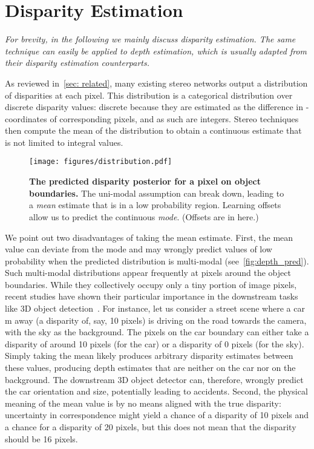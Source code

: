 \documentclass{article}
\begin{document}
 \section{Disparity Estimation}
\label{sec: approach}

\textit{For brevity, in the following we mainly discuss disparity estimation. The same technique can easily be applied to depth estimation, which is usually adapted from their disparity estimation counterparts.}


As reviewed in~\autoref{sec: related}, many existing stereo networks output a distribution of disparities at each pixel. 
This distribution is a categorical distribution over discrete disparity values: discrete because they are estimated as the difference in -coordinates of corresponding pixels, and as such are integers.
Stereo techniques then compute the mean of the distribution to obtain a continuous estimate that is not limited to integral values.

\begin{wrapfigure}{r}{0.7\textwidth}
\vskip -17pt
\texttt{[image: figures/distribution.pdf]}
\vskip -5pt
\caption{\small \textbf{The predicted disparity posterior for a pixel on object boundaries.} The uni-modal assumption can break down, leading to a  \emph{mean} estimate that is in a low probability region. Learning offsets allow us to predict the continuous \emph{mode}. (Offsets are in  here.) 
} \label{fig:depth_pred}
\vskip -5pt
\end{wrapfigure}



We point out two disadvantages of taking the mean estimate. First, the mean value can deviate from the mode and may wrongly predict values of low probability when the predicted distribution is multi-modal (see~\autoref{fig:depth_pred}). Such multi-modal distributions appear frequently at pixels around the object boundaries. While they collectively occupy only a tiny portion of image pixels, recent studies have shown their particular importance in the downstream tasks like 3D object detection~\cite{li2019stereo,qian2020end,li2018stereo}.
For instance, let us consider a street scene where a car m away (a disparity of, say, 10 pixels) is driving on the road towards the camera, with the sky as the background. The pixels on the car boundary can either take a disparity of around 10 pixels (for the car) or a disparity of 0 pixels (for the sky). Simply taking the mean likely produces arbitrary disparity estimates between these values, producing depth estimates that are neither on the car nor on the background. The downstream 3D object detector can, therefore, wrongly predict the car orientation and size, potentially leading to accidents. Second, 
the physical meaning of the mean value is by no means aligned with the true disparity: uncertainty in correspondence might yield a  chance of a disparity of 10 pixels and a  chance for a disparity of 20 pixels,  but this does not mean that the disparity should be 16 pixels. 
\end{document}
